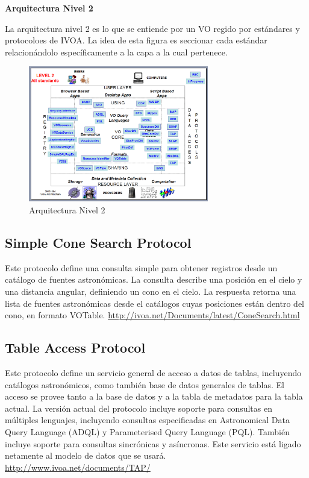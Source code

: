 \textbf{Arquitectura Nivel 2}%


La arquitectura nivel 2 es lo que se entiende por un VO regido por estándares
y protocoloes de IVOA.
La idea de esta figura es seccionar cada estándar relacionándolo específicamente
a la capa a la cual pertenece.

\begin{figure}
    \centering
    \includegraphics[width=0.7\textwidth]{img/arquitectura_2.png}
    \caption{Arquitectura Nivel 2}
    \label{fig:nivel2}
\end{figure}


\subsection{Simple Cone Search Protocol}


Este protocolo define una consulta simple para obtener registros desde un
catálogo de fuentes astronómicas. La consulta describe una posición en el cielo
y una distancia angular, definiendo un cono en el cielo. La respuesta retorna
una lista de fuentes astronómicas desde el catálogos cuyas posiciones están
dentro del cono, en formato VOTable.
\url{http://ivoa.net/Documents/latest/ConeSearch.html}

\subsection{Table Access Protocol}


Este protocolo define un servicio general de acceso a datos de tablas,
incluyendo catálogos astronómicos, como también base de datos generales de
tablas. El acceso se provee tanto a la base de datos y a la tabla de metadatos
para la tabla actual. La versión actual del protocolo incluye soporte para
consultas en múltiples lenguajes, incluyendo consultas especificadas en
Astronomical Data Query Language (ADQL) y Parameterised Query Language (PQL).
También incluye soporte para consultas sincrónicas y asíncronas. Este servicio
está ligado netamente al modelo de datos que se usará.
\url{http://www.ivoa.net/documents/TAP/}

